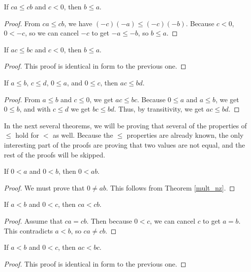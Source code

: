 \documentclass[../../math.tex]{subfiles}
\begin{document}
\begin{theorem} \label{le_mult_lcancel_neg}
    If $ca \leq cb$ and $c < 0$, then $b \leq a$.
\end{theorem}
\begin{proof}
    From $ca \leq cb$, we have $(-c)(-a) \leq (-c)(-b)$.  Because $c < 0$, $0 <
    -c$, so we can cancel $-c$ to get $-a \leq -b$, so $b \leq a$.
\end{proof}

\begin{theorem} \label{le_mult_rcancel_neg}
    If $ac \leq bc$ and $c < 0$, then $b \leq a$.
\end{theorem}
\begin{proof}
    This proof is identical in form to the previous one.
\end{proof}

\begin{theorem} \label{le_lrmult_pos}
    If $a \leq b$, $c \leq d$, $0 \leq a$, and $0 \leq c$, then $ac \leq bd$.
\end{theorem}
\begin{proof}
    From $a \leq b$ and $c \leq 0$, we get $ac \leq bc$.  Because $0 \leq a$ and
    $a \leq b$, we get $0 \leq b$, and with $c \leq d$ we get $bc \leq bd$.
    Thus, by transitivity, we get $ac \leq bd$.
\end{proof}

In the next several theorems, we will be proving that several of the properties
of $\leq$ hold for $<$ as well.  Because the $\leq$ properties are already
known, the only interesting part of the proofs are proving that two values are
not equal, and the rest of the proofs will be skipped.

\begin{theorem}
    If $0 < a$ and $0 < b$, then $0 < ab$.
\end{theorem}
\begin{proof}
    We must prove that $0 \neq ab$.  This follows from Theorem \ref{mult_nz}.
\end{proof}

\begin{theorem}
    If $a < b$ and $0 < c$, then $ca < cb$.
\end{theorem}
\begin{proof}
    Assume that $ca = cb$.  Then because $0 < c$, we can cancel $c$ to get $a =
    b$.  This contradicts $a < b$, so $ca \neq cb$.
\end{proof}

\begin{theorem}
    If $a < b$ and $0 < c$, then $ac < bc$.
\end{theorem}
\begin{proof}
    This proof is identical in form to the previous one.
\end{proof}
\end{document}
